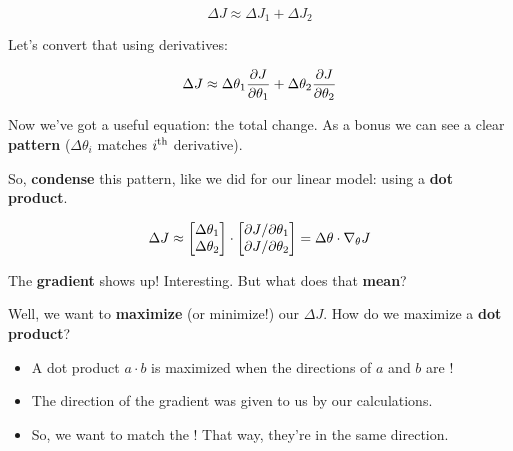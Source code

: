         \begin{equation}
            \Delta J \approx \Delta J_1 + \Delta J_2
        \end{equation}
        
        Let's convert that using derivatives:
        
        \begin{equation}
            \Delta J \approx
            \Delta \theta_1 \frac{\partial J}{\partial \theta_1} +
            \Delta \theta_2 \frac{\partial J}{\partial \theta_2}
        \end{equation}
        
        Now we've got a useful equation: the total change. As a bonus we can see a clear \textbf{pattern} ($\Delta \theta_i$ matches $i^{ \text{th} }$ derivative). 
        
        So, \textbf{condense} this pattern, like we did for our linear model: using a \textbf{dot product}.
        
        \begin{equation}
            \Delta J 
            \approx 
            \begin{bmatrix}
              \Delta \theta_1 \\ \Delta \theta_2
            \end{bmatrix}
            \cdot
            \begin{bmatrix}
                {\partial J}/{\partial  \theta_1}  \\ 
                {\partial J}/{\partial  \theta_2 } 
            \end{bmatrix}
            =
            \Delta \theta \cdot \nabla_\theta J
        \end{equation}
        
        The \textbf{gradient} shows up! Interesting. But what does that \textbf{mean}?
        
        Well, we want to \textbf{maximize} (or minimize!) our $\Delta J$. How do we maximize a \textbf{dot product}?

        \begin{itemize}
            \item A dot product $a \cdot b$ is maximized when the directions of $a$ and $b$ are !
            \item The direction of the gradient was given to us by our calculations.
            \item So, we want \gren{$\Delta \theta$} to match the ! That way, they're in the same direction.
        \end{itemize}
        
